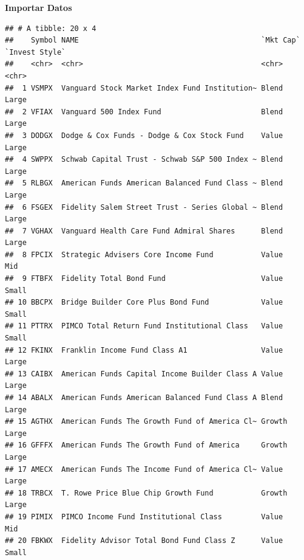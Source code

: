 \documentclass[
  12pt,
]{article}
\newenvironment{Shaded}{\begin{snugshade}}{\end{snugshade}}
\newcommand{\CommentTok}[1]{\textcolor[rgb]{0.56,0.35,0.01}{\textit{#1}}}
\newcommand{\FunctionTok}[1]{\textcolor[rgb]{0.00,0.00,0.00}{#1}}
\newcommand{\NormalTok}[1]{#1}
\newcommand{\OtherTok}[1]{\textcolor[rgb]{0.56,0.35,0.01}{#1}}
\newcommand{\SpecialCharTok}[1]{\textcolor[rgb]{0.00,0.00,0.00}{#1}}
\newcommand{\StringTok}[1]{\textcolor[rgb]{0.31,0.60,0.02}{#1}}
\begin{document}
\textbf{Importar Datos}

\begin{Shaded}
\end{Shaded}

\begin{verbatim}
## # A tibble: 20 x 4
##    Symbol NAME                                          `Mkt Cap` `Invest Style`
##    <chr>  <chr>                                         <chr>     <chr>         
##  1 VSMPX  Vanguard Stock Market Index Fund Institution~ Blend     Large         
##  2 VFIAX  Vanguard 500 Index Fund                       Blend     Large         
##  3 DODGX  Dodge & Cox Funds - Dodge & Cox Stock Fund    Value     Large         
##  4 SWPPX  Schwab Capital Trust - Schwab S&P 500 Index ~ Blend     Large         
##  5 RLBGX  American Funds American Balanced Fund Class ~ Blend     Large         
##  6 FSGEX  Fidelity Salem Street Trust - Series Global ~ Blend     Large         
##  7 VGHAX  Vanguard Health Care Fund Admiral Shares      Blend     Large         
##  8 FPCIX  Strategic Advisers Core Income Fund           Value     Mid           
##  9 FTBFX  Fidelity Total Bond Fund                      Value     Small         
## 10 BBCPX  Bridge Builder Core Plus Bond Fund            Value     Small         
## 11 PTTRX  PIMCO Total Return Fund Institutional Class   Value     Small         
## 12 FKINX  Franklin Income Fund Class A1                 Value     Large         
## 13 CAIBX  American Funds Capital Income Builder Class A Value     Large         
## 14 ABALX  American Funds American Balanced Fund Class A Blend     Large         
## 15 AGTHX  American Funds The Growth Fund of America Cl~ Growth    Large         
## 16 GFFFX  American Funds The Growth Fund of America     Growth    Large         
## 17 AMECX  American Funds The Income Fund of America Cl~ Value     Large         
## 18 TRBCX  T. Rowe Price Blue Chip Growth Fund           Growth    Large         
## 19 PIMIX  PIMCO Income Fund Institutional Class         Value     Mid           
## 20 FBKWX  Fidelity Advisor Total Bond Fund Class Z      Value     Small
\end{verbatim}
\end{document}
